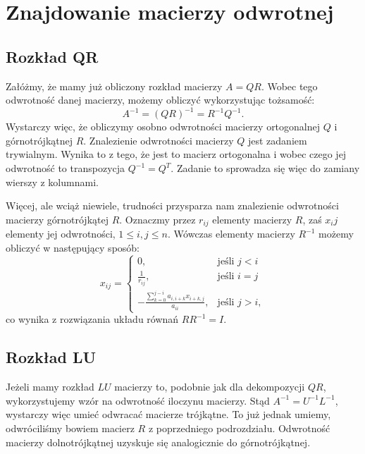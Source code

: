 \section{Znajdowanie macierzy odwrotnej}
\subsection{Rozkład QR}
Załóżmy, że mamy już obliczony rozkład macierzy $A=QR$. Wobec tego
odwrotność danej macierzy, możemy obliczyć wykorzystując tożsamość:
$$A^{-1}=(QR)^{-1}= R^{-1}Q^{-1}.$$
Wystarczy więc, że obliczymy osobno odwrotności macierzy ortogonalnej $Q$ i
górnotrójkątnej $R$. Znalezienie odwrotności macierzy $Q$ jest zadaniem
trywialnym. Wynika to z tego, że jest to macierz ortogonalna i
wobec czego jej odwrotność to transpozycja
$Q^{-1}=Q^{T}$. Zadanie to sprowadza się więc do zamiany wierszy z
kolumnami.

Więcej, ale wciąż niewiele, trudności przysparza nam znalezienie odwrotności
macierzy górnotrójkątej $R$. Oznaczmy przez $r_{ij}$ elementy macierzy $R$,
zaś $x_ij$ elementy jej odwrotności, $1 \leq i,j \leq n$. Wówczas elementy
macierzy $R^{-1}$ możemy obliczyć w następujący sposób:
$$ x_{ij}=
\begin{cases}
0, & \text{jeśli } j<i \\[8pt]
\displaystyle \frac{1}{r_{ij}}, & \text{jeśli } i=j \\[8pt]
\displaystyle -\frac{\sum_{k=0}^{j-i}a_{i,i+k}x_{i+k,j}}{a_{ii}}, & \text{jeśli } j>i, 
\end{cases}
$$
co wynika z rozwiązania układu równań $RR^{-1}=I$.
\subsection{Rozkład LU}
Jeżeli mamy rozkład $LU$ macierzy to, podobnie jak dla dekompozycji $QR$,
wykorzystujemy wzór na odwrotność iloczynu macierzy. Stąd $A^{-1}=U^{-1}L^{-1}$,
wystarczy więc umieć odwracać macierze trójkątne. To już jednak umiemy, odwróciliśmy
bowiem macierz $R$ z poprzedniego podrozdziału. Odwrotność macierzy dolnotrójkątnej
uzyskuje się analogicznie do górnotrójkątnej.

